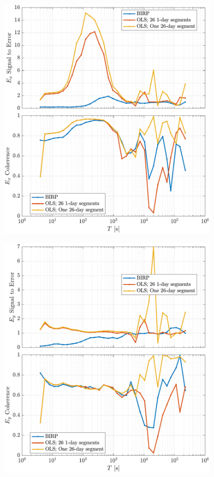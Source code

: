 \documentclass{article}
\begin{document}
\begin{figure}[h!]
\centering
\includegraphics[width=\textwidth]{figures/KAP103_Middelpos/SN_compare-E_x.pdf}
\caption{}
\label{fig:SN_Ex_Compare}
\end{figure}

\begin{figure}[h!]
\centering
\includegraphics[width=\textwidth]{figures/KAP103_Middelpos/SN_compare-E_y.pdf}
\caption{}
\label{fig:universe}
\end{figure}
\end{document}
